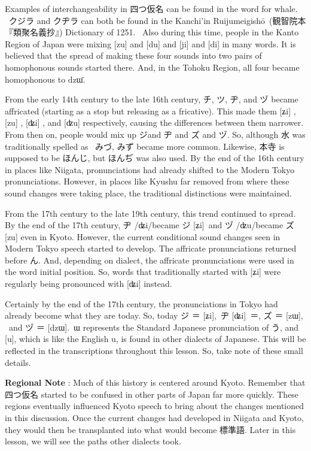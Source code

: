\par{ Examples of interchangeability in 四つ仮名 can be found in the word for whale.  クジラ and クヂラ can both be found in the Kanchi'in Ruijumeigishō (観智院本『類聚名義抄』) Dictionary of 1251.  Also during this time, people in the Kanto Region of Japan were mixing [zu] and [du] and [ji] and [di] in many words. It is believed that the spread of making these four sounds into two pairs of homophonous sounds started there. And, in the Tohoku Region, all four became homophonous to dzɯ̈. }

\par{ From the early 14th century to the late 16th century, チ, ツ, ヂ, and ヅ became affricated (starting as a stop but releasing as a fricative). This made them [ʑi] ,[zu] , [ʥi] , and [ʣu] respectively, causing the differences between them narrower. From then on, people would mix up ジand ヂ and ズ and ヅ. So, although 水 was traditionally spelled as  みづ, みず became more common. Likewise, 本寺 is supposed to be ほんじ, but ほんぢ was also used. By the end of the 16th century in places like Niigata, pronunciations had already shifted to the Modern Tokyo pronunciations. However, in places like Kyushu far removed from where these sound changes were taking place, the traditional distinctions were maintained. }

\par{ From the 17th century to the late 19th century, this trend continued to spread. By the end of the 17th century, ヂ \slash ʥi\slash  became ジ [ʑi] and ヅ \slash ʣu\slash  became ズ [zu] even in Kyoto. However, the current conditional sound changes seen in Modern Tokyo speech started to develop. The affricate pronunciations returned before ん. And, depending on dialect, the affricate pronunciations were used in the word initial position. So, words that traditionally started with [ʑi] were regularly being pronounced with [ʥi] instead. }

\par{ Certainly by the end of the 17th century, the pronunciations in Tokyo had already become what they are today. So, today ジ ＝ [ʑi], ヂ [ʥi] ＝, ズ ＝ [zɯ],  and ヅ ＝ [dzɯ]. ɯ represents the Standard Japanese pronunciation of う, and [u], which is like the English u, is found in other dialects of Japanese. This will be reflected in the transcriptions throughout this lesson. So, take note of these small details. }

\par{\textbf{Regional Note }: Much of this history is centered around Kyoto. Remember that 四つ仮名 started to be confused in other parts of Japan far more quickly. These regions eventually influenced Kyoto speech to bring about the changes mentioned in this discussion. Once the current changes had developed in Niigata and Kyoto, they would then be transplanted into what would become 標準語. Later in this lesson, we will see the paths other dialects took. }
      
